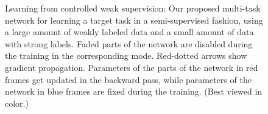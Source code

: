 \begin{figure}[!t]%
    \caption{Learning from controlled weak supervision: Our proposed multi-task network for learning a target task in a semi-supervised fashion, using a large amount of weakly labeled data and a small amount of data with strong labels.
    Faded parts of the network are disabled during the training in the corresponding mode. Red-dotted arrows show gradient propagation. Parameters of the parts of the network in red frames get updated in the backward pass, while parameters of the network in blue frames are fixed during the training. (Best viewed in color.)}
    \label{fig:model}
\end{figure}

